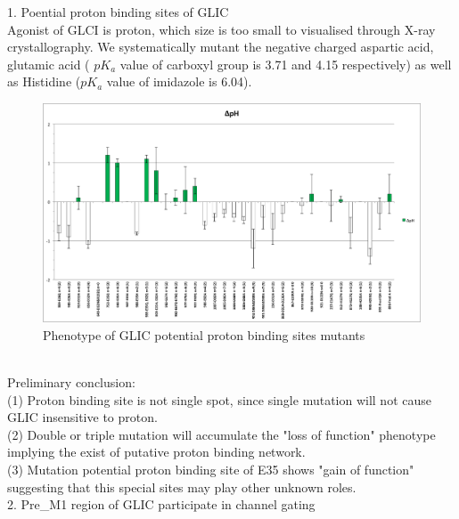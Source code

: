 \documentclass[12pt,a4paper,]{article}
\begin{document}
	
	
{\large 1. Poential proton binding sites of GLIC}\\	
	
Agonist of GLCI  is proton, which size  is too small to visualised through X-ray crystallography. 
We systematically mutant the negative charged  aspartic acid, glutamic acid ( $pK_a$ value of carboxyl group is 3.71 and 4.15 respectively)  as well as Histidine ($pK_a$ value of imidazole is 6.04). 
	\begin{figure}
	\caption{Phenotype of GLIC potential proton binding sites mutants}
	\centering
	\includegraphics[width=1\textwidth, ]{figure_GLIC/functional_result}
	\end{figure}\\
	
Preliminary conclusion:\\
	(1) Proton binding site is not single spot, since single mutation will not cause GLIC insensitive to proton.\\
	(2) Double or triple mutation will accumulate the "loss of  function" phenotype implying the exist of  putative proton binding network.\\
	(3) Mutation potential proton binding site of E35 shows "gain of function" suggesting that this special sites may play other  unknown roles.\\
	
	{\large 2. Pre\_M1 region of GLIC participate in channel gating }\\
	
\end{document}
